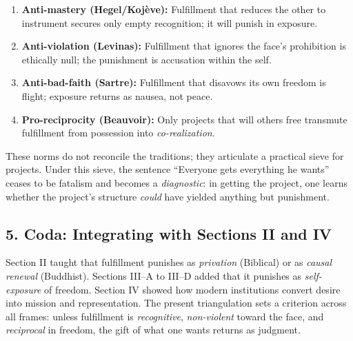 \begin{enumerate}
	\item \textbf{Anti-mastery (Hegel/Koj{\`e}ve):} Fulfillment that reduces the other to instrument secures only empty recognition; it will punish in exposure.
	\item \textbf{Anti-violation (Levinas):} Fulfillment that ignores the face’s prohibition is ethically null; the punishment is accusation within the self.
	\item \textbf{Anti-bad-faith (Sartre):} Fulfillment that disavows its own freedom is flight; exposure returns as nausea, not peace.
	\item \textbf{Pro-reciprocity (Beauvoir):} Only projects that will others free transmute fulfillment from possession into \emph{co-realization}.
\end{enumerate}

These norms do not reconcile the traditions; they articulate a practical sieve for projects. Under this sieve, the sentence “Everyone gets everything he wants” ceases to be fatalism and becomes a \emph{diagnostic}: in getting the project, one learns whether the project’s structure \emph{could} have yielded anything but punishment.

\subsection*{5. Coda: Integrating with Sections II and IV}
\label{ssec:5-coda-integrating-with-sections-ii-and-iv}
Section II taught that fulfillment punishes as \emph{privation} (Biblical) or as \emph{causal renewal} (Buddhist). Sections III--A to III--D added that it punishes as \emph{self-exposure} of freedom. Section IV showed how modern institutions convert desire into mission and representation. The present triangulation sets a criterion across all frames: unless fulfillment is \emph{recognitive}, \emph{non-violent} toward the face, and \emph{reciprocal} in freedom, the gift of what one wants returns as judgment.
